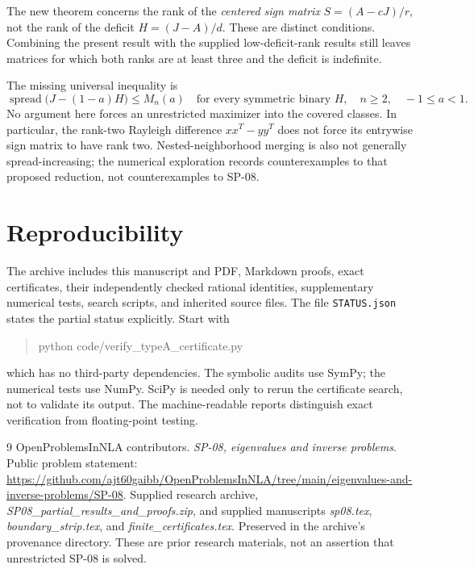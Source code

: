 \documentclass[11pt]{article}
\newcommand{\spn}{\operatorname{spread}}
\begin{document}
The new theorem concerns the rank of the \emph{centered sign matrix}
$S=(A-cJ)/r$, not the rank of the deficit $H=(J-A)/d$. These are distinct
conditions. Combining the present result with the supplied low-deficit-rank
results still leaves matrices for which both ranks are at least three and
the deficit is indefinite.

The missing universal inequality is
\[
 \boxed{\spn\bigl(J-(1-a)H\bigr)\le M_n(a)
 \quad\text{for every symmetric binary }H,
 \quad n\ge2,\quad -1\le a<1.}
\]
No argument here forces an unrestricted maximizer into the covered classes.
In particular, the rank-two Rayleigh difference $xx^T-yy^T$ does not force
its entrywise sign matrix to have rank two. Nested-neighborhood merging is
also not generally spread-increasing; the numerical exploration records
counterexamples to that proposed reduction, not counterexamples to SP-08.

\section{Reproducibility}
The archive includes this manuscript and PDF, Markdown proofs, exact
certificates, their independently checked rational identities, supplementary
numerical tests, search scripts, and inherited source files. The file
\texttt{STATUS.json} states the partial status explicitly. Start with
\begin{quote}\ttfamily
python code/verify\_typeA\_certificate.py
\end{quote}
which has no third-party dependencies. The symbolic audits use SymPy; the
numerical tests use NumPy. SciPy is needed only to rerun the certificate
search, not to validate its output. The machine-readable reports distinguish
exact verification from floating-point testing.

\begin{thebibliography}{9}
 OpenProblemsInNLA contributors.
\emph{SP-08, eigenvalues and inverse problems}. Public problem statement:
\url{https://github.com/ajt60gaibb/OpenProblemsInNLA/tree/main/eigenvalues-and-inverse-problems/SP-08}.
 Supplied research archive,
\emph{SP08\_partial\_results\_and\_proofs.zip}, and supplied manuscripts
\emph{sp08.tex}, \emph{boundary\_strip.tex}, and \emph{finite\_certificates.tex}.
Preserved in the archive's provenance directory. These are prior research
materials, not an assertion that unrestricted SP-08 is solved.
\end{thebibliography}
\end{document}
